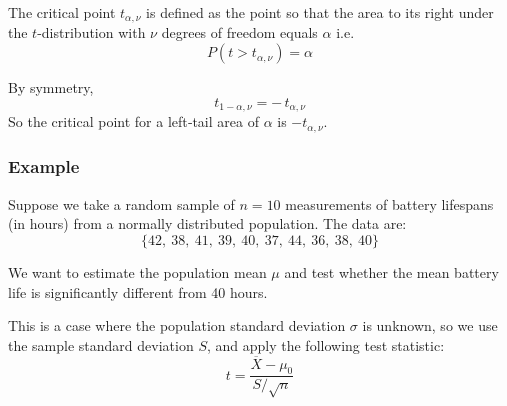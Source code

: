 \documentclass[twoside]{book}
\begin{document}
\begin{center}
\end{center}

The critical point \(t_{\alpha, \nu}\) is defined as the point so that the area to its right under the \(t\)-distribution with \(\nu\) degrees of freedom equals \(\alpha\) i.e.
$$P\left(t > t_{\alpha, \nu} \right)= \alpha$$

By symmetry,
\[
t_{1-\alpha, \nu} = -\,t_{\alpha, \nu}
\]
So the critical point for a left‐tail area of \(\alpha\) is \(-t_{\alpha, \nu}\).

\subsubsection{Example}

Suppose we take a random sample of \( n = 10 \) measurements of battery lifespans (in hours) from a normally distributed population. The data are:
\[
\{42,\ 38,\ 41,\ 39,\ 40,\ 37,\ 44,\ 36,\ 38,\ 40\}
\]

We want to estimate the population mean \( \mu \) and test whether the mean battery life is significantly different from 40 hours.

This is a case where the population standard deviation \( \sigma \) is unknown, so we use the sample standard deviation \( S \), and apply the following test statistic:
\[
t = \frac{\overline{X} - \mu_0}{S / \sqrt{n}}
\]
\end{document}
